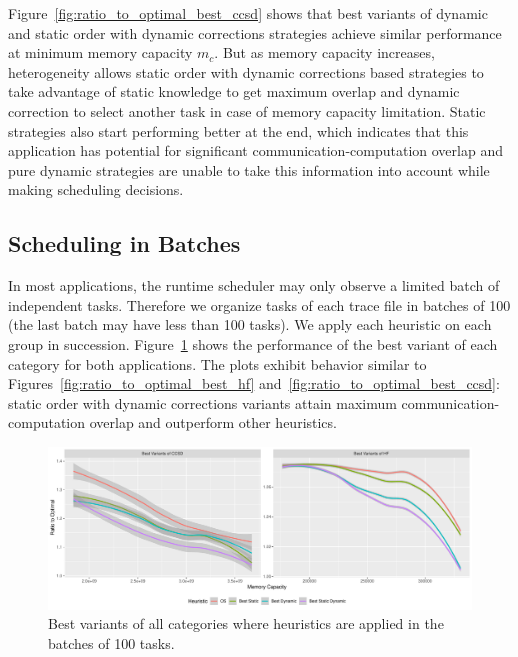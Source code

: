 \documentclass[sigconf]{acmart}
\begin{document}
{		Figure~\ref{fig:ratio_to_optimal_best_ccsd} shows that best variants of dynamic and static order with dynamic corrections strategies achieve similar performance at minimum memory capacity $m_c$. But as memory capacity increases, heterogeneity allows static order with dynamic corrections based strategies to take advantage of static knowledge to get maximum overlap and dynamic correction to select another task in case of memory capacity limitation. Static strategies also start performing better at the end, which indicates that this application has potential for significant communication-computation overlap and pure dynamic strategies are unable to take this information into account while making scheduling decisions.
		
		\subsection{Scheduling in Batches}
		In most applications, the runtime scheduler may only observe a limited batch of independent tasks. Therefore we organize tasks of each trace file in batches of 100 (the last batch may have less than 100 tasks). We apply each heuristic on each group in succession. Figure~\ref{fig:best_variants_batch} shows the performance of the best variant of each category for both applications. The plots exhibit behavior similar to Figures~\ref{fig:ratio_to_optimal_best_hf} and~\ref{fig:ratio_to_optimal_best_ccsd}: static order with dynamic corrections variants attain maximum communication-computation overlap and outperform other heuristics.
		
		\begin{figure}[htb]
			\includegraphics[scale=0.5]{./results/ratio_to_optimal_batch-best.pdf}
			\caption{Best variants of all categories where heuristics are applied in the batches of 100 tasks.}
			\label{fig:best_variants_batch}
		\end{figure}
		
}
\end{document}
